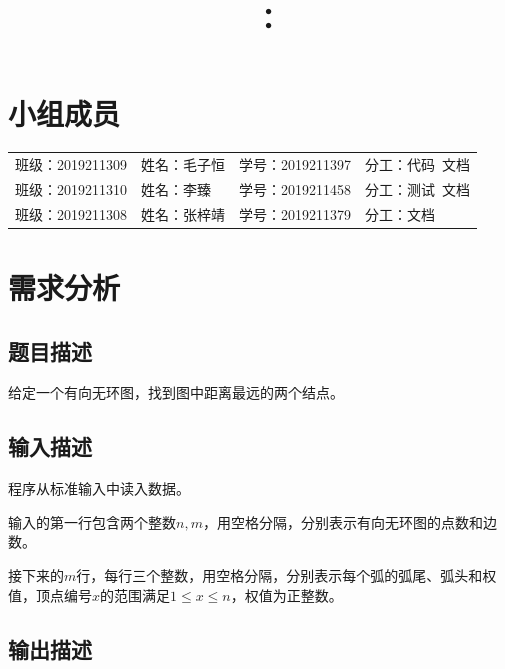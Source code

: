 \documentclass{article}
\title{\hmwkClass\ ：\hmwkTitle}
\author{\hmwkAuthorName}
\begin{document}
\maketitle

\section*{小组成员}

\setlength{\tabcolsep}{9mm}
{
    \begin{table}[htbp]
        \centering
        \begin{tabular}{llll}
            班级：2019211309 & 姓名：毛子恒 & 学号：2019211397 & 分工：代码\ 文档   \\

            班级：2019211310 & 姓名：李臻   & 学号：2019211458 & 分工：测试\ 文档   \\

            班级：2019211308 & 姓名：张梓靖 & 学号：2019211379 & 分工：文档 \\
        \end{tabular}
    \end{table}
}

\tableofcontents
\newpage

\section{需求分析}

\subsection{题目描述}

给定一个有向无环图，找到图中距离最远的两个结点。

\subsection{输入描述}

程序从标准输入中读入数据。

输入的第一行包含两个整数$n,m$，用空格分隔，分别表示有向无环图的点数和边数。

接下来的$m$行，每行三个整数，用空格分隔，分别表示每个弧的弧尾、弧头和权值，顶点编号$x$的范围满足$1\leq x\leq n$，权值为正整数。

\subsection{输出描述}
\end{document}
